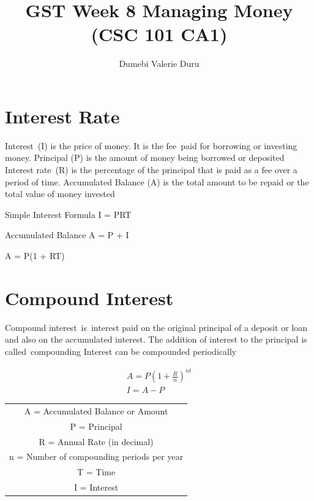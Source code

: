 \documentclass{article}
\begin{document}
	\begin{titlepage}
		\author{Dumebi Valerie Duru}
		\title{GST Week 8 Managing Money (CSC 101 CA1)}
		\maketitle
	\end{titlepage}
	
	\tableofcontents
	\newpage
	
	\section{Interest Rate}
	Interest (I) is the price of money. It is the fee paid for borrowing or investing money.
	\newline 
	Principal (P) is the amount of money being borrowed or deposited
	\newline
	Interest rate (R) is the percentage of the principal that is paid as a fee over a period of time.
	\newline 
	Accumulated Balance (A) is the total amount to be repaid or the total value of money invested
	\newline
	
	\begin{center}
		Simple Interest Formula I = PRT 
	
		Accumulated Balance A = P + I
	
		A = P(1 + RT)
	\end{center}
	
	\section{Compound Interest}
		Compound interest is interest paid on the original principal of a deposit or loan and also on the accumulated interest. 
		The addition of interest to the principal is called compounding
		Interest can be compounded periodically
		
		\begin{align*}
			A = P(1 + \frac{R}{n}) ^ {nt} \\
			I = A - P
		\end{align*}
		
			\begin{table}[h!]
				\centering
				\begin{tabular}{|c|}
					\hline
					A = Accumulated Balance or Amount\\
					P = Principal\\
					R = Annual Rate (in decimal)\\
					n = Number of compounding periods per year\\
					T = Time\\
					I = Interest\\
					\hline
				\end{tabular}
			\end{table}
		
\end{document}
